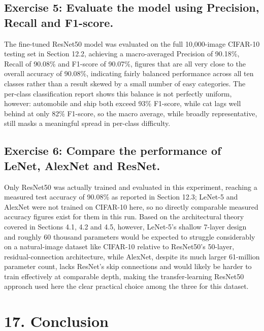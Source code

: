 \documentclass[11pt,a4paper]{article}
\begin{document}
\subsection*{Exercise 5: Evaluate the model using Precision, Recall and F1-score.}

The fine-tuned ResNet50 model was evaluated on the full 10,000-image CIFAR-10 testing set in Section 12.2, achieving a macro-averaged Precision of 90.18\%, Recall of 90.08\% and F1-score of 90.07\%, figures that are all very close to the overall accuracy of 90.08\%, indicating fairly balanced performance across all ten classes rather than a result skewed by a small number of easy categories. The per-class classification report shows this balance is not perfectly uniform, however: automobile and ship both exceed 93\% F1-score, while cat lags well behind at only 82\% F1-score, so the macro average, while broadly representative, still masks a meaningful spread in per-class difficulty.

\subsection*{Exercise 6: Compare the performance of LeNet, AlexNet and ResNet.}

Only ResNet50 was actually trained and evaluated in this experiment, reaching a measured test accuracy of 90.08\% as reported in Section 12.3; LeNet-5 and AlexNet were not trained on CIFAR-10 here, so no directly comparable measured accuracy figures exist for them in this run. Based on the architectural theory covered in Sections 4.1, 4.2 and 4.5, however, LeNet-5's shallow 7-layer design and roughly 60 thousand parameters would be expected to struggle considerably on a natural-image dataset like CIFAR-10 relative to ResNet50's 50-layer, residual-connection architecture, while AlexNet, despite its much larger 61-million parameter count, lacks ResNet's skip connections and would likely be harder to train effectively at comparable depth, making the transfer-learning ResNet50 approach used here the clear practical choice among the three for this dataset.

\section*{17. Conclusion}
\end{document}
